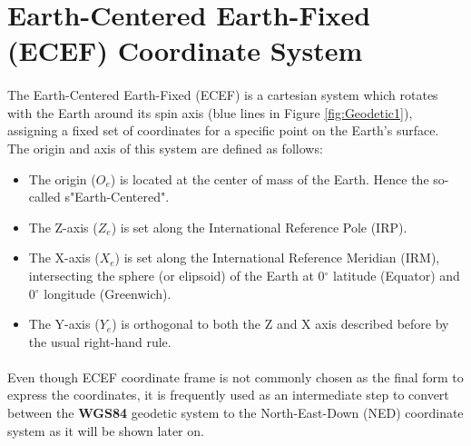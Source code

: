 \section{Earth-Centered Earth-Fixed (ECEF) Coordinate System}\label{sec:ecef}

\paragraph{}The Earth-Centered Earth-Fixed (ECEF) is a cartesian system which rotates with the Earth around its spin axis (blue lines in Figure \ref{fig:Geodetic1}), assigning a fixed set of coordinates for a specific point on the Earth's surface. The origin and axis of this system are defined as follows:
\begin{itemize}
\item{The origin (\textbf{$O_{e}$}) is located at the center of mass of the Earth. Hence the so-called s"Earth-Centered".}
\item{The Z-axis (\textbf{$Z_{e}$})} is set along the International Reference Pole (IRP).
\item{The X-axis (\textbf{$X_{e}$})} is set along the International Reference Meridian (IRM), intersecting the sphere (or elipsoid) of the Earth at 0$^{\circ}$ latitude (Equator) and 0$^{\circ}$ longitude (Greenwich).
\item{The Y-axis (\textbf{$Y_{e}$})} is orthogonal to both the Z and X axis described before by the usual right-hand rule.
\end{itemize}

\paragraph{}Even though ECEF coordinate frame is not commonly chosen as the final form to express the coordinates, it is frequently used as an intermediate step to convert between the \textbf{WGS84} geodetic system to the North-East-Down (NED) coordinate system as it will be shown later on.